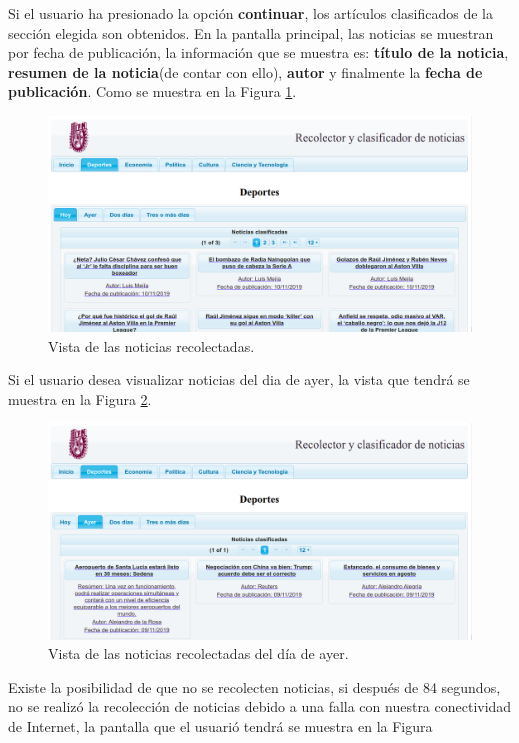 Si el usuario ha presionado la opción \textbf{continuar}, los artículos clasificados de la sección elegida son obtenidos. En la pantalla principal, las noticias se muestran por fecha de publicación, la información que se muestra es: \textbf{título de la noticia}, \textbf{resumen de la noticia}(de contar con ello), \textbf{autor} y finalmente la \textbf{fecha de publicación}. Como se muestra en la Figura \ref{fig:vistaNoticias}.

\begin{figure}[H]
\centering
\includegraphics[scale=0.29]{imagenes/Capitulo5/noticiasDeHoy.png}
\caption{Vista de las noticias recolectadas.}
\label{fig:vistaNoticias}
\end{figure}


Si el usuario desea visualizar noticias del dia de ayer, la vista que tendrá se muestra en la Figura \ref{fig:vistaNoticiasAyer}.
\\
\begin{figure}[H]
\centering
\includegraphics[scale=0.29]{imagenes/Capitulo5/noticiasDeAyer.png}
\caption{Vista de las noticias recolectadas del día de ayer.}
\label{fig:vistaNoticiasAyer}
\end{figure}

Existe la posibilidad de que no se recolecten noticias, si después de 84 segundos, no se realizó la recolección de noticias debido a una falla con nuestra conectividad de Internet, la pantalla que el usuarió tendrá se muestra en la Figura 
